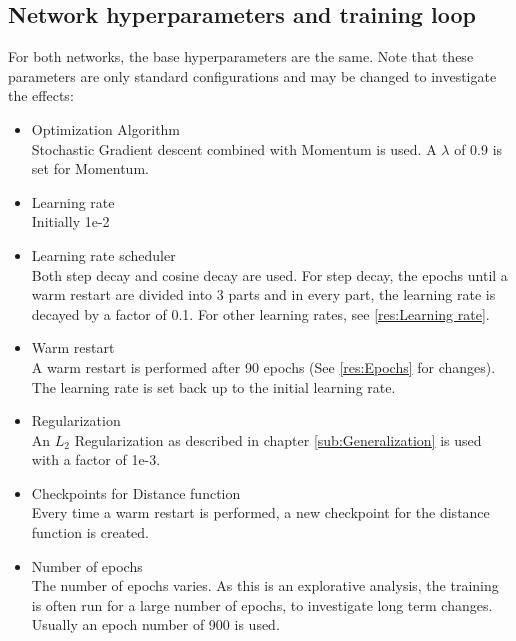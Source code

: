 \subsection{Network hyperparameters and training loop}
For both networks, the base hyperparameters are the same. Note that these
parameters are only standard configurations and may be changed to investigate
the effects:
\begin{itemize}
    \item Optimization Algorithm \\Stochastic Gradient descent combined with
    Momentum is used. A $\lambda$ of 0.9 is set for Momentum.
    \item Learning rate \\Initially 1e-2
    \item Learning rate scheduler \\ Both step decay and cosine decay are used.
    For step decay, the epochs until a warm restart are divided into 3 parts and
    in every part, the learning rate is decayed by a factor of 0.1. For other
    learning rates, see \ref{res:Learning rate}.
    \item Warm restart \\ A warm restart is performed after 90 epochs (See
    \ref{res:Epochs} for changes). The learning rate is set back up to the
    initial learning rate.
    \item Regularization \\An $L_2$ Regularization as described in chapter
    \ref{sub:Generalization} is used with a factor of 1e-3.
    \item Checkpoints for Distance function \\Every time a warm restart is
    performed, a new checkpoint for the distance function is created.
    \item Number of epochs \\The number of epochs varies. As this is an
    explorative analysis, the training is often run for a large number of
    epochs, to investigate long term changes. Usually an epoch number of 900 is
    used.
\end{itemize}

